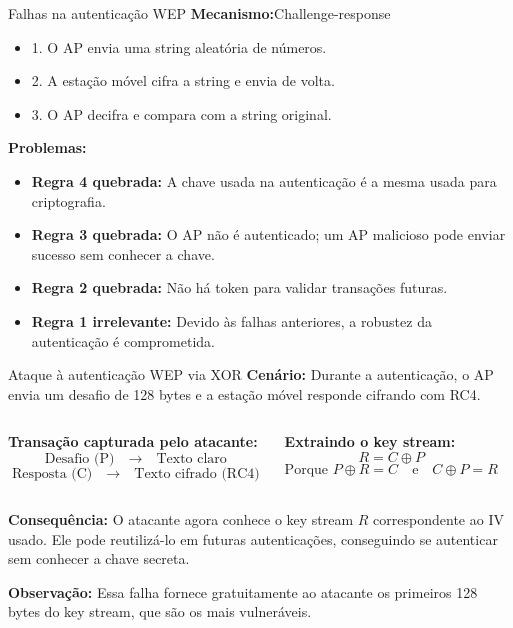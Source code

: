 \begin{frame}{Falhas na autenticação WEP}
    \textbf{Mecanismo:}Challenge-response  \begin{itemize}

        \item 1. O AP envia uma string aleatória de números.
        \item 2. A estação móvel cifra a string e envia de volta.
        \item 3. O AP decifra e compara com a string original.

    \end{itemize}
    \bigskip
    \textbf{Problemas:}
    \begin{itemize}
        \item \textbf{Regra 4 quebrada:} A chave usada na autenticação é a mesma usada para criptografia.
        \item \textbf{Regra 3 quebrada:} O AP não é autenticado; um AP malicioso pode enviar sucesso sem conhecer a chave.
        \item \textbf{Regra 2 quebrada:} Não há token para validar transações futuras.
        \item \textbf{Regra 1 irrelevante:} Devido às falhas anteriores, a robustez da autenticação é comprometida.
    \end{itemize}
\end{frame}


\begin{frame}{Ataque à autenticação WEP via XOR}
    \textbf{Cenário:} Durante a autenticação, o AP envia um desafio de 128 bytes e a estação móvel responde cifrando com RC4.

    \begin{columns}[t]
        \textbf{Transação capturada pelo atacante:}
        \[
            \text{Desafio (P)} \quad \rightarrow \quad \text{Texto claro}
        \]
        \[
            \text{Resposta (C)} \quad \rightarrow \quad \text{Texto cifrado (RC4)}
        \]

        \textbf{Extraindo o key stream:}
        \[
            R = C \oplus P
        \]
        \[
            \text{Porque } P \oplus R = C \quad \text{e} \quad C \oplus P = R
        \]
    \end{columns}

    \bigskip
    \textbf{Consequência:}
    O atacante agora conhece o key stream \(R\) correspondente ao IV usado. Ele pode reutilizá-lo em futuras autenticações, conseguindo se autenticar sem conhecer a chave secreta.

    \textbf{Observação:} Essa falha fornece gratuitamente ao atacante os primeiros 128 bytes do key stream, que são os mais vulneráveis.
\end{frame}

